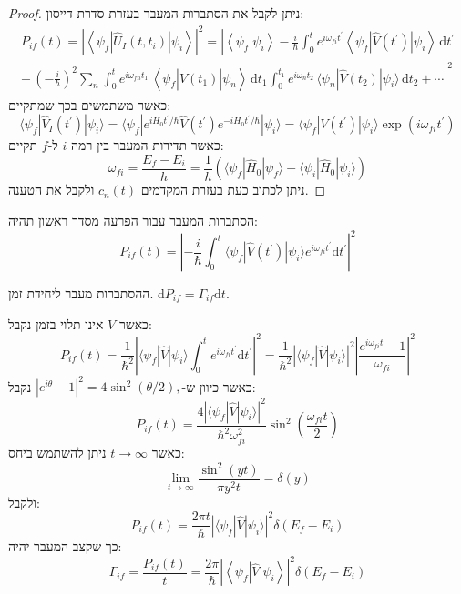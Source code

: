 \documentclass{tstextbook}
\begin{document}
\begin{proof}
ניתן לקבל את הסתברות המעבר בעזרת סדרת דייסון:
\begin{gather*}P_{i f}(t)=\left|\left\langle \psi_{f}|\hat{U}_{I}(t,t_{i})|\psi_{i} \right\rangle\right|^{2}=\left|\left\langle \psi_{f}|\psi_{i} \right\rangle-\frac{i}{\hbar}\int_{0}^{t}e^{i\omega_{f i}t^{\prime}}\left\langle \psi_{f}|\hat{V}\left( t^{\prime} \right)|\psi_{i} \right\rangle\,\mathrm{d}t^{\prime}\right.\\ \left.+\,\left(-\frac{i}{\hbar}\right)^{2}\sum_{n}\int_{0}^{t}e^{i\omega_{f n}t_{1}}\,\left\langle \psi_{f}|\hat{V}(t_{1})|\psi_{n} \right\rangle\,\mathrm{d}t_{1}\!\!\int_{0}^{t_{1}}\!e^{i\omega_{n}t_{2}}\,\langle \psi_{n}|\hat{V}(t_{2})|\psi_{i} \rangle\,\mathrm{d}t_{2}+\cdots\right|^{2} 
\end{gather*}
כאשר משתמשים בכך שמתקיים:
$$\langle\psi_{f}|\hat{V}_{I}(t^{\prime})|\psi_{i}\rangle=\langle\psi_{f}| e^{i H_{0}t^{\prime}/\hbar}\hat{V}(t^{\prime})e^{-i H_{0}t^{\prime}/\hbar}|\psi_{i}\rangle=\langle\psi_{f}| V(t^{\prime})|\psi_{i}\rangle\exp\left(i\omega_{f i}t^{\prime}\right)$$
כאשר תדירות המעבר בין רמה \(i\) ל-\(f\) תקיים:
$$\omega_{f i}=\frac{E_{f}-E_{i}}{h}=\frac{1}{h}\left(\langle\psi_{f}|\hat{H}_{0}|\psi_{f}\rangle-\langle\psi_{i}|\hat{H}_{0}|\psi_{i}\rangle\right)$$
ניתן לכתוב כעת בעזרת המקדמים \(c_{n}(t)\) ולקבל את הטענה.

\end{proof}
\begin{corollary}
הסתברות המעבר עבור הפרעה מסדר ראשון תהיה:
$$P_{i f}(t)=\left|-\frac{i}{\hbar}\int_{0}^{t}\langle\psi_{f}|\hat{V}(t^{\prime})|\psi_{i}\rangle e^{i\omega_{f i}t^{\prime}}\mathrm{d}t^{\prime}\right|^{2}$$

\end{corollary}
\begin{definition}
ההסתברות מעבר ליחידת זמן. \(\mathrm{d}P_{if}=\Gamma_{if}\mathrm{d}t\).

\end{definition}
\begin{example}
כאשר \(V\) אינו תלוי בזמן נקבל:
$$P_{i f}(t)=\frac{1}{\hbar^{2}}\left| \langle\psi_{f} | \hat{V} | \psi_{i}\rangle\int_{0}^{t}e^{i\omega_{f i}t^{\prime}}\mathrm{d}t^{\prime}\right|^{2}\!\!=\!\frac{1}{\hbar^{2}}\left| \langle\psi_{f} | \hat{V} | \psi_{i}\rangle\right|^{2}\left| \frac{e^{i\omega_{f i}t}-1}{\omega_{f i}}\right|^{2}$$
כאשר כיוון ש-\(|e^{i\theta}-1|^{2}=4\sin^{2}(\theta/2),\) נקבל:
$$P_{i f}(t)=\frac{4\left| \langle\psi_{f} | \hat{V} | \psi_{i}\rangle\right|^{2}}{\hbar^{2}\omega_{f i}^{2}}\sin^{2}\left(\frac{\omega_{f i}t}{2}\right)$$
כאשר \(t\to \infty\) ניתן להשתמש ביחס:
$$\operatorname*{lim}_{t\rightarrow\infty}\frac{\sin^{2}(y t)}{\pi y^{2}t}=\delta(y)$$
ולקבל:
$$P_{i f}(t)=\frac{2\pi t}{\hbar}\left| \langle\psi_{f} | \hat{V} | \psi_{i}\rangle\right|^{2}\delta(E_{f}-E_{i})$$
כך שקצב המעבר יהיה:
$$\Gamma_{i f}=\frac{P_{i f}(t)}{t}=\frac{2\pi}{\hbar}\left|\left<\psi_{f}|\hat{V}|\psi_{i}\right>\right|^{2}\delta(E_{f}-E_{i})$$

\end{example}
\end{document}
